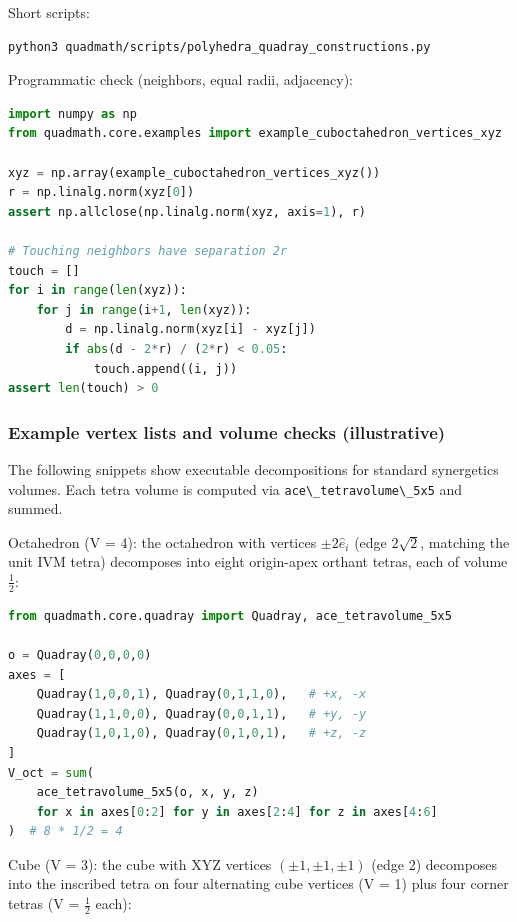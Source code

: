 \documentclass[
  10pt,
]{article}
\newcommand{\passthrough}[1]{#1}
\begin{document}
Short scripts:

\begin{lstlisting}[language=bash]
python3 quadmath/scripts/polyhedra_quadray_constructions.py
\end{lstlisting}

Programmatic check (neighbors, equal radii, adjacency):

\begin{lstlisting}[language=Python]
import numpy as np
from quadmath.core.examples import example_cuboctahedron_vertices_xyz

xyz = np.array(example_cuboctahedron_vertices_xyz())
r = np.linalg.norm(xyz[0])
assert np.allclose(np.linalg.norm(xyz, axis=1), r)

# Touching neighbors have separation 2r
touch = []
for i in range(len(xyz)):
    for j in range(i+1, len(xyz)):
        d = np.linalg.norm(xyz[i] - xyz[j])
        if abs(d - 2*r) / (2*r) < 0.05:
            touch.append((i, j))
assert len(touch) > 0
\end{lstlisting}

\subsubsection{Example vertex lists and volume checks
(illustrative)}\label{example-vertex-lists-and-volume-checks-illustrative}

The following snippets show executable decompositions for standard
synergetics volumes. Each tetra volume is computed via
\passthrough{\lstinline!ace\_tetravolume\_5x5!} and summed.

Octahedron (V = 4): the octahedron with vertices \(\pm 2\hat e_i\) (edge
\(2\sqrt2\), matching the unit IVM tetra) decomposes into eight
origin-apex orthant tetras, each of volume \(\tfrac12\):

\begin{lstlisting}[language=Python]
from quadmath.core.quadray import Quadray, ace_tetravolume_5x5

o = Quadray(0,0,0,0)
axes = [
    Quadray(1,0,0,1), Quadray(0,1,1,0),   # +x, -x
    Quadray(1,1,0,0), Quadray(0,0,1,1),   # +y, -y
    Quadray(1,0,1,0), Quadray(0,1,0,1),   # +z, -z
]
V_oct = sum(
    ace_tetravolume_5x5(o, x, y, z)
    for x in axes[0:2] for y in axes[2:4] for z in axes[4:6]
)  # 8 * 1/2 = 4
\end{lstlisting}

Cube (V = 3): the cube with XYZ vertices \((\pm1,\pm1,\pm1)\) (edge 2)
decomposes into the inscribed tetra on four alternating cube vertices (V
= 1) plus four corner tetras (V = \(\tfrac12\) each):
\end{document}
